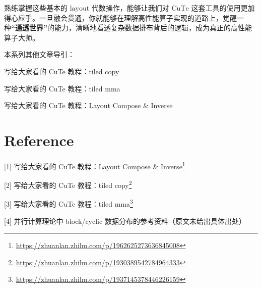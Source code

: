 熟练掌握这些基本的 $\text{layout}$ 代数操作，能够让我们对 $\text{CuTe}$ 这套工具的使用更加得心应手。一旦融会贯通，你就能够在理解高性能算子实现的道路上，觉醒一种\textbf{“通透世界”}的能力，清晰地看透复杂数据排布背后的逻辑，成为真正的高性能算子大师。

本系列其他文章导引：

写给大家看的 CuTe 教程：tiled copy

写给大家看的 CuTe 教程：tiled mma

写给大家看的 CuTe 教程：Layout Compose \& Inverse

\section{Reference}

[1] 写给大家看的 CuTe 教程：Layout Compose \& Inverse\footnote{\url{https://zhuanlan.zhihu.com/p/1962625273636845008}}

[2] 写给大家看的 CuTe 教程：tiled copy\footnote{\url{https://zhuanlan.zhihu.com/p/1930389542784964333}}

[3] 写给大家看的 CuTe 教程：tiled mma\footnote{\url{https://zhuanlan.zhihu.com/p/1937145378446226159}}

[4] 并行计算理论中 block/cyclic 数据分布的参考资料（原文未给出具体出处）
